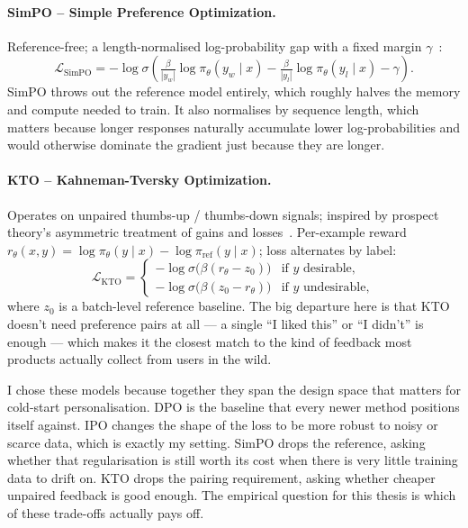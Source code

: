\paragraph{SimPO -- Simple Preference Optimization.} Reference-free; a length-normalised log-probability gap with a fixed margin $\gamma$~\citep{meng2024simpo}:
\begin{equation}
\mathcal{L}_{\text{SimPO}} = -\log \sigma\!\left(\tfrac{\beta}{|y_w|}\log \pi_\theta(y_w \mid x) - \tfrac{\beta}{|y_l|}\log \pi_\theta(y_l \mid x) - \gamma\right).
\end{equation}
SimPO throws out the reference model entirely, which roughly halves the memory and compute needed to train. It also normalises by sequence length, which matters because longer responses naturally accumulate lower log-probabilities and would otherwise dominate the gradient just because they are longer.

\paragraph{KTO -- Kahneman-Tversky Optimization.} Operates on unpaired thumbs-up / thumbs-down signals; inspired by prospect theory's asymmetric treatment of gains and losses~\citep{ethayarajh2024kto}. Per-example reward $r_\theta(x, y) = \log \pi_\theta(y \mid x) - \log \pi_{\text{ref}}(y \mid x)$; loss alternates by label:
\begin{equation}
\mathcal{L}_{\text{KTO}} =
\begin{cases}
-\log \sigma\!\big(\beta(r_\theta - z_0)\big) & \text{if } y \text{ desirable},\\
-\log \sigma\!\big(\beta(z_0 - r_\theta)\big) & \text{if } y \text{ undesirable},
\end{cases}
\end{equation}
where $z_0$ is a batch-level reference baseline. The big departure here is that KTO doesn't need preference pairs at all --- a single ``I liked this'' or ``I didn't'' is enough --- which makes it the closest match to the kind of feedback most products actually collect from users in the wild.

I chose these models because together they span the design space that matters for cold-start personalisation. DPO is the baseline that every newer method positions itself against. IPO changes the shape of the loss to be more robust to noisy or scarce data, which is exactly my setting. SimPO drops the reference, asking whether that regularisation is still worth its cost when there is very little training data to drift on. KTO drops the pairing requirement, asking whether cheaper unpaired feedback is good enough. The empirical question for this thesis is which of these trade-offs actually pays off.


